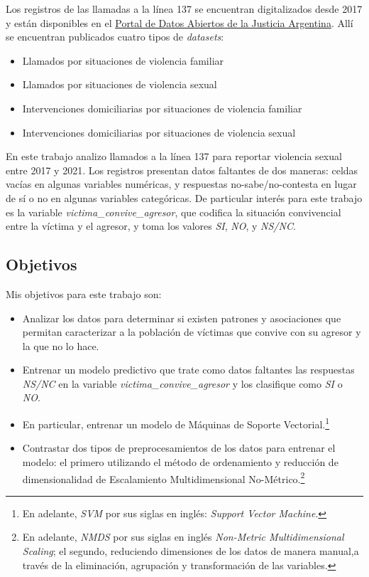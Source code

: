 \documentclass[10 pt]{article}
\begin{document}
Los registros de las llamadas a la línea 137 se encuentran digitalizados desde 2017 y están disponibles en el \href{http://datos.jus.gob.ar/}{Portal de Datos Abiertos de la Justicia Argentina}. Allí se encuentran publicados cuatro tipos de \textit{datasets}: 

\begin{itemize}
    \item Llamados por situaciones de violencia familiar
    \item Llamados por situaciones de violencia sexual
    \item Intervenciones domiciliarias por situaciones de violencia familiar
    \item Intervenciones domiciliarias por situaciones de violencia sexual
\end{itemize}

En este trabajo analizo llamados a la línea 137 para reportar violencia sexual entre 2017 y 2021. Los registros  presentan datos faltantes de dos maneras: celdas vacías en algunas variables numéricas, y respuestas no-sabe/no-contesta en lugar de sí o no en algunas variables categóricas. De particular interés para este trabajo es la variable \textit{victima\_convive\_agresor}, que codifica la situación convivencial entre la víctima y el agresor, y toma los valores \textit{SI}, \textit{NO}, y \textit{NS/NC}.

\subsection{Objetivos}

Mis objetivos para este trabajo son:

\begin{itemize}
    \item Analizar los datos para determinar si existen patrones y asociaciones que permitan caracterizar a la población de víctimas que convive con su agresor y la que no lo hace.
    \item Entrenar un modelo predictivo que trate como datos faltantes las respuestas \textit{NS/NC} en la variable \textit{victima\_convive\_agresor} y los clasifique como \textit{SI} o \textit{NO}. 
    \item En particular, entrenar un modelo de Máquinas de Soporte Vectorial.\footnote{En adelante, \textit{SVM} por sus siglas en inglés: \textit{Support Vector Machine}.}  
    \item Contrastar dos tipos de preprocesamientos de los datos para entrenar el modelo: el primero utilizando el método de ordenamiento y reducción de dimensionalidad de Escalamiento Multidimensional No-Métrico.\footnote{En adelante, \textit{NMDS} por sus siglas en inglés \textit{Non-Metric Multidimensional Scaling}; el segundo, reduciendo dimensiones de los datos de manera manual,a través de la eliminación, agrupación y transformación de las variables.}

\end{itemize}
\end{document}
